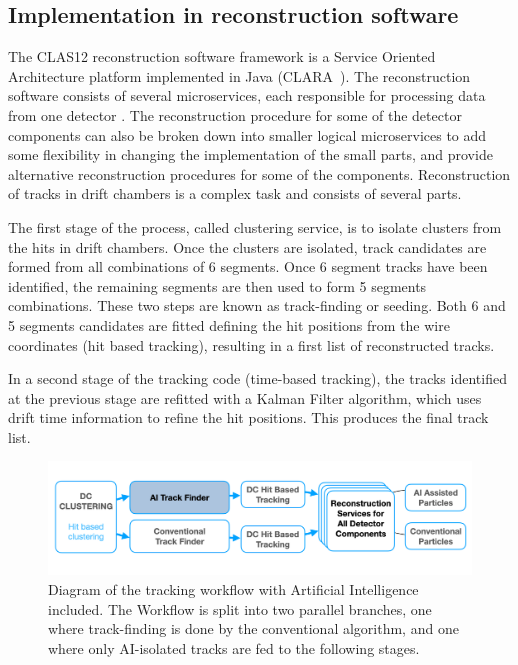 \subsection{Implementation in reconstruction software}

The CLAS12 reconstruction software framework is a Service Oriented Architecture platform implemented in Java (CLARA~\cite{Gyurjyan:2011zz}).
The reconstruction software consists of several microservices, each responsible for processing data from one
detector \cite{Ziegler:2020gsr}. The reconstruction procedure for some of the detector components can also 
be broken down into smaller logical microservices to add some flexibility in changing the implementation of 
the small parts, and provide alternative reconstruction procedures for some of the components. Reconstruction 
of tracks in drift chambers is a complex task and consists of several parts.

The first stage of the process, called clustering service, is to isolate clusters from the hits in drift chambers. 
Once the clusters are isolated, track candidates are formed from all combinations of 6 segments. Once 6 
segment tracks have been identified, the remaining segments are then used to form 5 segments combinations. 
These two steps are known as track-finding or seeding. Both 6 and 5 segments candidates are fitted defining 
the hit positions from the wire coordinates (hit based tracking), resulting in a first list of reconstructed tracks.

In a second stage of the tracking code (time-based tracking), the tracks identified at the previous stage are 
refitted with a Kalman Filter algorithm, which uses drift time information to refine the hit positions. This 
produces the final track list.

\begin{figure}[!ht]
\begin{center}
 \includegraphics[width=6.0in]{images/CLARA_AI_diagram.png}
\caption {Diagram of the tracking workflow with Artificial Intelligence included. The Workflow is split into 
two parallel branches, one where track-finding is done by the conventional algorithm, and one where only 
AI-isolated tracks are fed to the following stages.}
 \label{recon:diagram}
 \end{center}
\end{figure}


